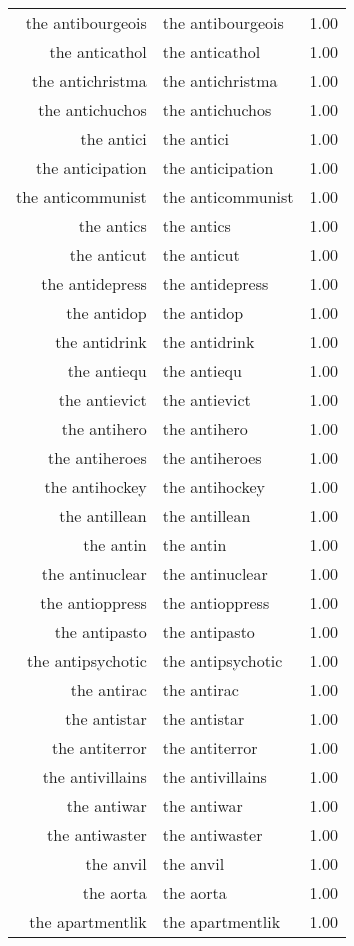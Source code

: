 \begin{table}[ht]
\begin{tabular}{rlr}
  the antibourgeois & the antibourgeois & 1.00 \\ 
  the anticathol & the anticathol & 1.00 \\ 
  the antichristma & the antichristma & 1.00 \\ 
  the antichuchos & the antichuchos & 1.00 \\ 
  the antici & the antici & 1.00 \\ 
  the anticipation & the anticipation & 1.00 \\ 
  the anticommunist & the anticommunist & 1.00 \\ 
  the antics & the antics & 1.00 \\ 
  the anticut & the anticut & 1.00 \\ 
  the antidepress & the antidepress & 1.00 \\ 
  the antidop & the antidop & 1.00 \\ 
  the antidrink & the antidrink & 1.00 \\ 
  the antiequ & the antiequ & 1.00 \\ 
  the antievict & the antievict & 1.00 \\ 
  the antihero & the antihero & 1.00 \\ 
  the antiheroes & the antiheroes & 1.00 \\ 
  the antihockey & the antihockey & 1.00 \\ 
  the antillean & the antillean & 1.00 \\ 
  the antin & the antin & 1.00 \\ 
  the antinuclear & the antinuclear & 1.00 \\ 
  the antioppress & the antioppress & 1.00 \\ 
  the antipasto & the antipasto & 1.00 \\ 
  the antipsychotic & the antipsychotic & 1.00 \\ 
  the antirac & the antirac & 1.00 \\ 
  the antistar & the antistar & 1.00 \\ 
  the antiterror & the antiterror & 1.00 \\ 
  the antivillains & the antivillains & 1.00 \\ 
  the antiwar & the antiwar & 1.00 \\ 
  the antiwaster & the antiwaster & 1.00 \\ 
  the anvil & the anvil & 1.00 \\ 
  the aorta & the aorta & 1.00 \\ 
  the apartmentlik & the apartmentlik & 1.00 \\ 

\end{tabular}
\end{table}
